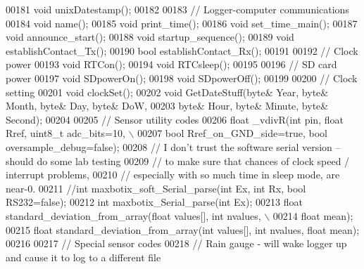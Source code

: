 \begin{DoxyCode}
00181     \textcolor{keywordtype}{void} unixDatestamp();
00182     
00183     \textcolor{comment}{// Logger-computer communications}
00184     \textcolor{keywordtype}{void} name();
00185     \textcolor{keywordtype}{void} print\_time();
00186     \textcolor{keywordtype}{void} set\_time\_main();
00187     \textcolor{keywordtype}{void} announce\_start();
00188     \textcolor{keywordtype}{void} startup\_sequence();
00189     \textcolor{keywordtype}{void} establishContact\_Tx();
00190     \textcolor{keywordtype}{bool} establishContact\_Rx();
00191     
00192     \textcolor{comment}{// Clock power}
00193     \textcolor{keywordtype}{void} RTCon();
00194     \textcolor{keywordtype}{void} RTCsleep();
00195     
00196     \textcolor{comment}{// SD card power}
00197     \textcolor{keywordtype}{void} SDpowerOn();
00198     \textcolor{keywordtype}{void} SDpowerOff();
00199     
00200     \textcolor{comment}{// Clock setting}
00201     \textcolor{keywordtype}{void} clockSet();
00202     \textcolor{keywordtype}{void} GetDateStuff(byte& Year, byte& Month, byte& Day, byte& DoW, 
00203         byte& Hour, byte& Minute, byte& Second);
00204     
00205     \textcolor{comment}{// Sensor utility codes}
00206     \textcolor{keywordtype}{float} \_vdivR(\textcolor{keywordtype}{int} pin, \textcolor{keywordtype}{float} Rref, uint8\_t adc\_bits=10, \(\backslash\)
00207           \textcolor{keywordtype}{bool} Rref\_on\_GND\_side=\textcolor{keyword}{true}, \textcolor{keywordtype}{bool} oversample\_debug=\textcolor{keyword}{false});
00208     \textcolor{comment}{// I don't trust the software serial version -- should do some lab testing }
00209     \textcolor{comment}{// to make sure that chances of clock speed / interrupt problems, }
00210     \textcolor{comment}{// especially with so much time in sleep mode, are near-0.}
00211     \textcolor{comment}{//int maxbotix\_soft\_Serial\_parse(int Ex, int Rx, bool RS232=false);}
00212     \textcolor{keywordtype}{int} maxbotix\_Serial\_parse(\textcolor{keywordtype}{int} Ex);
00213     \textcolor{keywordtype}{float} standard\_deviation\_from\_array(\textcolor{keywordtype}{float} values[], \textcolor{keywordtype}{int} nvalues, \(\backslash\)
00214           \textcolor{keywordtype}{float} mean);
00215     \textcolor{keywordtype}{float} standard\_deviation\_from\_array(\textcolor{keywordtype}{int} values[], \textcolor{keywordtype}{int} nvalues, \textcolor{keywordtype}{float} mean);
00216 
00217     \textcolor{comment}{// Special sensor codes}
00218     \textcolor{comment}{// Rain gauge - will wake logger up and cause it to log to a different file}

\end{DoxyCode}
